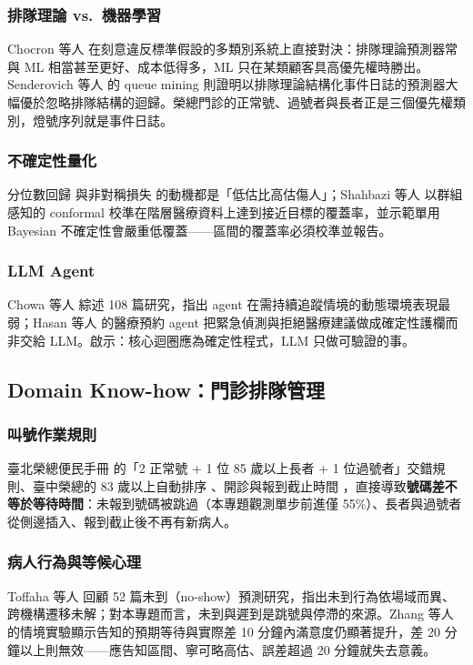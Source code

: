 \documentclass[11pt,twocolumn]{article}
\begin{document}
\subsubsection{排隊理論 vs.\ 機器學習}
Chocron 等人 \cite{chocron2022} 在刻意違反標準假設的多類別系統上直接對決：排隊理論預測器常與 ML 相當甚至更好、成本低得多，ML 只在某類顧客具高優先權時勝出。Senderovich 等人 \cite{senderovich2015} 的 queue mining 則證明以排隊理論結構化事件日誌的預測器大幅優於忽略排隊結構的迴歸。榮總門診的正常號、過號者與長者正是三個優先權類別，燈號序列就是事件日誌。

\subsubsection{不確定性量化}
分位數回歸 \cite{pak2021} 與非對稱損失 \cite{shin2024} 的動機都是「低估比高估傷人」；Shahbazi 等人 \cite{shahbazi2026} 以群組感知的 conformal 校準在階層醫療資料上達到接近目標的覆蓋率，並示範單用 Bayesian 不確定性會嚴重低覆蓋——區間的覆蓋率必須校準並報告。

\subsubsection{LLM Agent}
Chowa 等人 \cite{chowa2026} 綜述 108 篇研究，指出 agent 在需持續追蹤情境的動態環境表現最弱；Hasan 等人 \cite{hasan2026} 的醫療預約 agent 把緊急偵測與拒絕醫療建議做成確定性護欄而非交給 LLM。啟示：核心迴圈應為確定性程式，LLM 只做可驗證的事。

\subsection{Domain Know-how：門診排隊管理}
\subsubsection{叫號作業規則}
臺北榮總便民手冊 \cite{vghtpe2025} 的「2 正常號 + 1 位 85 歲以上長者 + 1 位過號者」交錯規則、臺中榮總的 83 歲以上自動排序 \cite{vghtcnotice}、開診與報到截止時間 \cite{vghtcreg}，直接導致\textbf{號碼差不等於等待時間}：未報到號碼被跳過（本專題觀測單步前進僅 55\%）、長者與過號者從側邊插入、報到截止後不再有新病人。

\subsubsection{病人行為與等候心理}
Toffaha 等人 \cite{toffaha2025} 回顧 52 篇未到（no-show）預測研究，指出未到行為依場域而異、跨機構遷移未解；對本專題而言，未到與遲到是跳號與停滯的來源。Zhang 等人 \cite{zhang2023} 的情境實驗顯示告知的預期等待與實際差 10 分鐘內滿意度仍顯著提升，差 20 分鐘以上則無效——應告知區間、寧可略高估、誤差超過 20 分鐘就失去意義。
\end{document}
